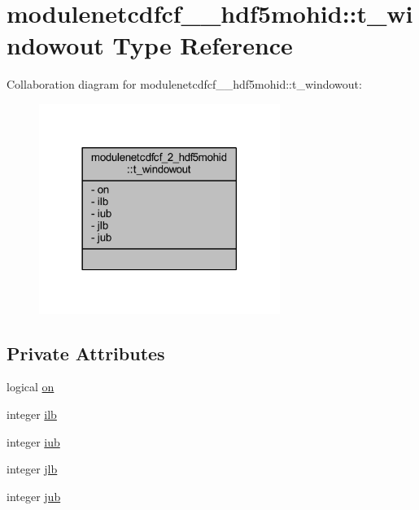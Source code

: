 \hypertarget{structmodulenetcdfcf__2__hdf5mohid_1_1t__windowout}{}\section{modulenetcdfcf\+\_\+\_\+hdf5mohid\+:\+:t\+\_\+windowout Type Reference}
\label{structmodulenetcdfcf__2__hdf5mohid_1_1t__windowout}


Collaboration diagram for modulenetcdfcf\+\_\+\_\+hdf5mohid\+:\+:t\+\_\+windowout\+:\nopagebreak
\begin{figure}[H]
\begin{center}
\leavevmode
\includegraphics[width=222pt]{structmodulenetcdfcf__2__hdf5mohid_1_1t__windowout__coll__graph}
\end{center}
\end{figure}
\subsection*{Private Attributes}
\begin{DoxyCompactItemize}
\item 
logical \mbox{\hyperlink{structmodulenetcdfcf__2__hdf5mohid_1_1t__windowout_acfaab5bcdbaf96b9af01d6cbcbf3704f}{on}}
\item 
integer \mbox{\hyperlink{structmodulenetcdfcf__2__hdf5mohid_1_1t__windowout_af9a25b015a298d54410015ba4c555044}{ilb}}
\item 
integer \mbox{\hyperlink{structmodulenetcdfcf__2__hdf5mohid_1_1t__windowout_acaac87451eb8bf67dfffe83dceaabb18}{iub}}
\item 
integer \mbox{\hyperlink{structmodulenetcdfcf__2__hdf5mohid_1_1t__windowout_a8bb2f86f65bf26c9ef00cd27514148e9}{jlb}}
\item 
integer \mbox{\hyperlink{structmodulenetcdfcf__2__hdf5mohid_1_1t__windowout_aa45fb466e57f229b3bfafaaa44ca45cd}{jub}}
\end{DoxyCompactItemize}



